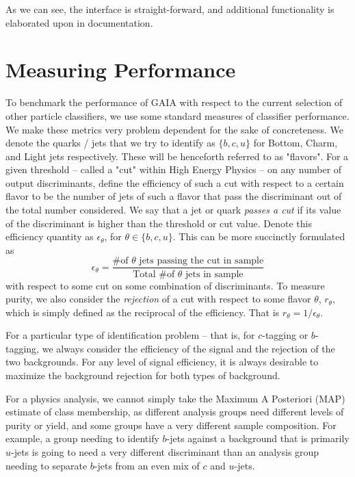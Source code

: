As we can see, the interface is straight-forward, and additional functionality is elaborated upon in documentation. 

\section{Measuring Performance}


To benchmark the performance of GAIA with respect to the current selection of other particle classifiers,  we use some standard measures of classifier performance. We make these metrics very problem dependent for the sake of concreteness. We denote the quarks / jets that we try to identify as $\{b,c,u\}$ for Bottom, Charm, and Light jets respectively. These will be henceforth referred to as "flavors". For a given threshold -- called a "cut" within High Energy Physics -- on any number of output discriminants, define the efficiency of such a cut with respect to a certain flavor to be the number of jets of such a flavor that pass the discriminant out of the total number considered. We say that a jet or quark \emph{passes a cut} if its value of the discriminant is higher than the threshold or cut value.  Denote this efficiency quantity as $\epsilon_\theta$, for $\theta\in\{b,c,u\}$. This can be more succinctly formulated as
\begin{equation}
\epsilon_\theta = \frac{\text{\# of }\theta\text{ jets passing the cut in sample}}{\text{Total \# of }\theta\text{ jets in sample}}
\end{equation}
 with respect to some cut on some combination of discriminants. To measure purity, we also consider the \emph{rejection} of a cut with respect to some flavor $\theta$, $r_\theta$, which is simply defined as the reciprocal of the efficiency. That is $r_\theta = 1 / \epsilon_\theta$.
 
For a particular type of identification problem -- that is, for $c$-tagging or $b$-tagging, we always consider the efficiency of the signal and the rejection of the two backgrounds. For any level of signal efficiency, it is always desirable to maximize the background rejection for both types of background. 

For a physics analysis, we cannot simply take the Maximum A Posteriori (MAP) estimate of class membership, as different analysis groups need different levels of purity or yield, and some groups have a very different sample composition. For example, a group needing to identify $b$-jets against a background that is primarily $u$-jets is going to need a very different discriminant than an analysis group needing to separate $b$-jets from an even mix of $c$ and $u$-jets. 

